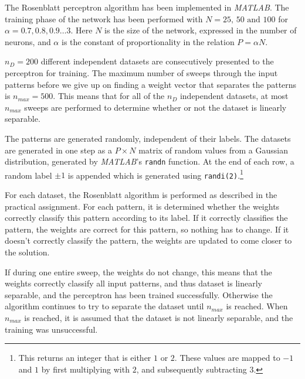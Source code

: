 The Rosenblatt perceptron algorithm has been implemented in \emph{MATLAB}.
The training phase of the network has been performed with \(N=25\text{, } 50 \text{ and } 100\) for \(\alpha = 0.7, 0.8, 0.9 \dots 3\).
Here \(N\) is the size of the network, expressed in the number of neurons, and \(\alpha\) is the constant of proportionality in the relation \(P = \alpha N\).

\(n_D = 200\) different independent datasets are consecutively presented to the perceptron for training.
The maximum number of sweeps through the input patterns before we give up on finding a weight vector that separates the patterns is \(n_{max} = 500\).
This means that for all of the \(n_D\) independent datasets, at most \(n_{max}\) sweeps are performed to determine whether or not the dataset is linearly separable.

The patterns are generated randomly, independent of their labels.
The datasets are generated in one step as a \(P \times N\) matrix of random values from a Gaussian distribution, generated by \emph{MATLAB}'s \texttt{randn} function.
At the end of each row, a random label \(\pm 1\) is appended which is generated using \texttt{randi(2)}.\footnote{
	This returns an integer that is either \(1\) or \(2\).
	These values are mapped to \(-1\) and \(1\) by first multiplying with \(2\), and subsequently subtracting \(3\).
}

For each dataset, the Rosenblatt algorithm is performed as described in the practical assignment.
For each pattern, it is determined whether the weights correctly classify this pattern according to its label.
If it correctly classifies the pattern, the weights are correct for this pattern, so nothing has to change.
If it doesn't correctly classify the pattern, the weights are updated to come closer to the solution.

If during one entire sweep, the weights do not change, this means that the weights correctly classify all input patterns, and thus dataset is linearly separable, and the perceptron has been trained successfully.
Otherwise the algorithm continues to try to separate the dataset until \(n_{max}\) is reached.
When \(n_{max}\) is reached, it is assumed that the dataset is not linearly separable, and the training was unsuccessful.